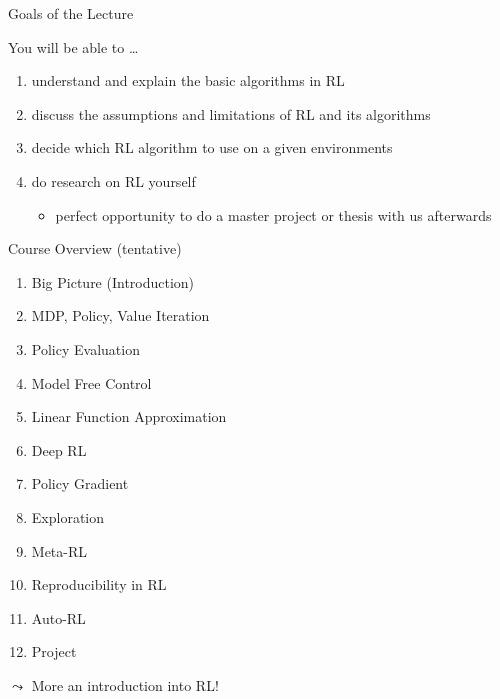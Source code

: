 \documentclass[aspectratio=169]{../latex_main/tntbeamer}  %
\begin{document}
\begin{frame}[c]{Goals of the Lecture}
	
	You will be able to \ldots
	\begin{enumerate}
		\item understand and explain the basic algorithms in RL
		\smallskip
		\item discuss the assumptions and limitations of RL and its algorithms
		\smallskip
		\item decide which RL algorithm to use on a given environments
		\smallskip
		\item do research on RL yourself
		\begin{itemize}
			\item perfect opportunity to do a master project or thesis with us afterwards
		\end{itemize}
	\end{enumerate}
	
\end{frame}
\begin{frame}[c]{Course Overview (tentative)}
	
	\begin{enumerate}
		\item Big Picture (Introduction)
		\item MDP, Policy, Value Iteration
		\item Policy Evaluation
		\item Model Free Control
		\item Linear Function Approximation
		\item Deep RL
		\item Policy Gradient
		\item Exploration
		\item Meta-RL
		\item Reproducibility in RL
		\item Auto-RL
		\item Project
	\end{enumerate}
	
	\pause
	$\leadsto$ \alert{More an introduction into RL!}
	
\end{frame}
\end{document}
